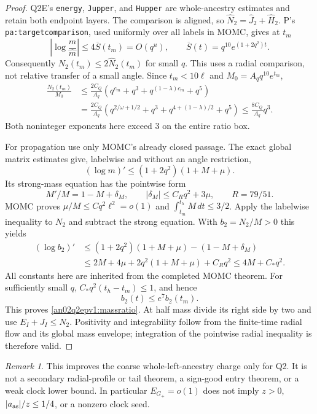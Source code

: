 \documentclass[11pt]{article}
\theoremstyle{remark}\newtheorem{remark}[theorem]{Remark}
\newcommand{\dd}{\,d}
\begin{document}
\begin{proof}
Q2E's \texttt{energy}, \texttt{Jupper}, and \texttt{Hupper}
are whole-ancestry estimates and retain both endpoint layers.
The comparison is aligned, so
$\widehat N_2=\widehat J_2+\widehat H_2$.
P's \texttt{pa:targetcomparison}, used uniformly over all labels
in MOMC, gives at $t_m$
\[
 \left|\log\frac{m}{\widehat m}\right|
 \le4\overline S(t_m)=O(q^u),\qquad
 \overline S(t)=q^{10}e^{(1+2q^2)t}.
\]
Consequently $N_2(t_m)\le2\widehat N_2(t_m)$ for small $q$.
This uses a radial comparison, not relative transfer of a small angle.
Since $t_m<10\ell$ and $M_0=A_q q^{10}e^{t_m}$,
\begin{align}
 \frac{N_2(t_m)}{M_0}
 &\le \frac{2C_Q}{A_q}
 \left(q^{c_m}+q^3+q^{(1-\lambda)c_m}+q^5\right)\nonumber\\
 &=\frac{2C_Q}{A_q}
 \left(q^{2/\omega+1/2}+q^3+
             q^{4+(1-\lambda)/2}+q^5\right)
 \le\frac{8C_Q}{A_q}q^3 .
 \label{an02q2epv1:earlyenergy}
\end{align}
Both noninteger exponents here exceed $3$ on the entire ratio box.

For propagation use only MOMC's already closed passage.
The exact global matrix estimates give, labelwise and without
an angle restriction,
\[
 (\log m)'\le(1+2q^2)(1+M+\mu).
\]
Its strong-mass equation has the pointwise form
\[
 M'/M=1-M+\delta_M,\qquad
 |\delta_M|\le C_Rq^2+3\mu,\qquad R=79/51.
\]
MOMC proves $\mu/M\le Cq^2\ell^2=o(1)$ and
$\int_{t_m}^{t_h}M\dd t\le3/2$.
Apply the labelwise inequality to $N_2$ and subtract the
strong equation. With $b_2=N_2/M>0$ this yields
\begin{align*}
 (\log b_2)'
 &\le (1+2q^2)(1+M+\mu)-(1-M+\delta_M)\\
 &\le 2M+4\mu+2q^2(1+M+\mu)+C_Rq^2
 \le4M+C_*q^2 .
\end{align*}
All constants here are inherited from the completed MOMC theorem.
For sufficiently small $q$, $C_*q^2(t_h-t_m)\le1$, and hence
\[
 b_2(t)\le e^7 b_2(t_m).
\]
This proves \eqref{an02q2epv1:massratio}.
At half mass divide its right side by two and use
$E_I+J_I\le N_2$. Positivity and integrability follow from the
finite-time radial flow and its global mass envelope; integration
of the pointwise radial inequality is therefore valid.
\end{proof}

\begin{remark}\label{an02q2epv1:energyscope}
This improves the coarse whole-left-ancestry charge only for Q2.
It is not a secondary radial-profile or tail theorem, a sign-good
entry theorem, or a weak clock lower bound. In particular
$E_{G_+}=o(1)$ does not imply $z>0$, $|a_{\rm as}|/z\le1/4$,
or a nonzero clock seed.
\end{remark}
\end{document}
